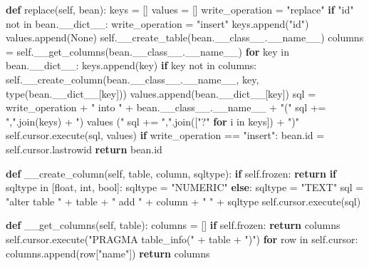 \documentclass[]{article}
\newenvironment{Shaded}{}{}
\newcommand{\KeywordTok}[1]{\textcolor[rgb]{0.00,0.44,0.13}{\textbf{{#1}}}}
\newcommand{\DataTypeTok}[1]{\textcolor[rgb]{0.56,0.13,0.00}{{#1}}}
\newcommand{\StringTok}[1]{\textcolor[rgb]{0.25,0.44,0.63}{{#1}}}
\newcommand{\OtherTok}[1]{\textcolor[rgb]{0.00,0.44,0.13}{{#1}}}
\newcommand{\NormalTok}[1]{{#1}}
\begin{document}
\begin{Shaded}
\begin{Highlighting}[]
    \KeywordTok{def} \NormalTok{replace(}\OtherTok{self}\NormalTok{, bean):}
        \NormalTok{keys = []}
        \NormalTok{values = []}
        \NormalTok{write_operation = }\StringTok{"replace"}
        \KeywordTok{if} \StringTok{"id"} \NormalTok{not in bean.__dict__:}
            \NormalTok{write_operation = }\StringTok{"insert"}
            \NormalTok{keys.append(}\StringTok{"id"}\NormalTok{)}
            \NormalTok{values.append(}\OtherTok{None}\NormalTok{)}
        \OtherTok{self}\NormalTok{.__create_table(bean.__class__.}\OtherTok{__name__}\NormalTok{)}
        \NormalTok{columns = }\OtherTok{self}\NormalTok{.__get_columns(bean.__class__.}\OtherTok{__name__}\NormalTok{)}
        \KeywordTok{for} \NormalTok{key in bean.__dict__:}
            \NormalTok{keys.append(key)}
            \KeywordTok{if} \NormalTok{key not in columns:}
                \OtherTok{self}\NormalTok{.__create_column(bean.__class__.}\OtherTok{__name__}\NormalTok{, key,}
                        \DataTypeTok{type}\NormalTok{(bean.__dict__[key]))}
            \NormalTok{values.append(bean.__dict__[key])}
        \NormalTok{sql  = write_operation + }\StringTok{" into "} \NormalTok{+ bean.__class__.}\OtherTok{__name__} \NormalTok{+ }\StringTok{"("}
        \NormalTok{sql += }\StringTok{","}\NormalTok{.join(keys) + }\StringTok{") values ("} 
        \NormalTok{sql += }\StringTok{","}\NormalTok{.join([}\StringTok{"?"} \KeywordTok{for} \NormalTok{i in keys])  +  }\StringTok{")"}
        \OtherTok{self}\NormalTok{.cursor.execute(sql, values)}
        \KeywordTok{if} \NormalTok{write_operation == }\StringTok{"insert"}\NormalTok{:}
            \NormalTok{bean.}\DataTypeTok{id} \NormalTok{= }\OtherTok{self}\NormalTok{.cursor.lastrowid}
        \KeywordTok{return} \NormalTok{bean.}\DataTypeTok{id}

    \KeywordTok{def} \NormalTok{__create_column(}\OtherTok{self}\NormalTok{, table, column, sqltype):}
        \KeywordTok{if} \OtherTok{self}\NormalTok{.frozen:}
            \KeywordTok{return}
        \KeywordTok{if} \NormalTok{sqltype in [}\DataTypeTok{float}\NormalTok{, }\DataTypeTok{int}\NormalTok{, }\DataTypeTok{bool}\NormalTok{]:}
            \NormalTok{sqltype = }\StringTok{"NUMERIC"}
        \KeywordTok{else}\NormalTok{:}
            \NormalTok{sqltype = }\StringTok{"TEXT"}
        \NormalTok{sql = }\StringTok{"alter table "} \NormalTok{+ table + }\StringTok{" add "} \NormalTok{+ column + }\StringTok{" "} \NormalTok{+ sqltype    }
        \OtherTok{self}\NormalTok{.cursor.execute(sql)}

    \KeywordTok{def} \NormalTok{__get_columns(}\OtherTok{self}\NormalTok{, table):}
        \NormalTok{columns = []}
        \KeywordTok{if} \OtherTok{self}\NormalTok{.frozen:}
            \KeywordTok{return} \NormalTok{columns}
        \OtherTok{self}\NormalTok{.cursor.execute(}\StringTok{"PRAGMA table_info("} \NormalTok{+ table  + }\StringTok{")"}\NormalTok{)}
        \KeywordTok{for} \NormalTok{row in }\OtherTok{self}\NormalTok{.cursor:}
            \NormalTok{columns.append(row[}\StringTok{"name"}\NormalTok{])}
        \KeywordTok{return} \NormalTok{columns}


\end{Highlighting}
\end{Shaded}
\end{document}
